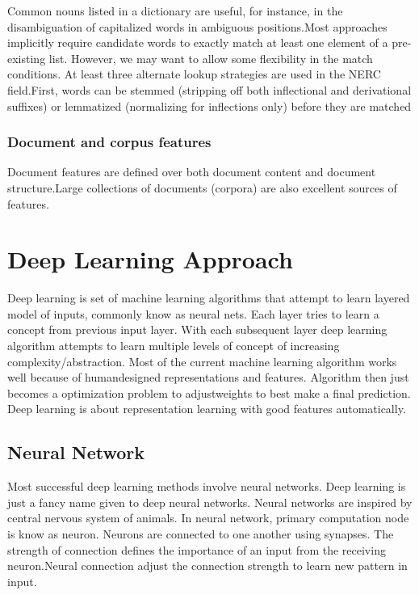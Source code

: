 \documentclass[12pt,a4paper,final]{extreport}
\begin{document}
\vspace{0.5cm}
Common nouns listed in a dictionary are useful, for instance, in the disambiguation of capitalized words in ambiguous positions.Most approaches implicitly require candidate words to exactly match at least one element
of a pre-existing list. However, we may want to allow some flexibility in the match conditions. At least three alternate lookup strategies are used in the NERC field.First, words can be stemmed (stripping off both inflectional and derivational suffixes) or lemmatized (normalizing for inflections only) before they are matched

\subsubsection{Document and corpus features}
Document features are defined over both document content and document structure.Large collections of documents (corpora) are also excellent sources of features.


\section{Deep Learning Approach}
Deep learning is set of machine learning algorithms that attempt to learn layered model of inputs, commonly know as neural nets. Each layer tries to learn a concept from previous input layer. With each subsequent layer deep learning algorithm attempts to learn multiple levels of concept of increasing complexity/abstraction. Most of the current machine learning algorithm works well because of humandesigned representations and features. Algorithm then just becomes a optimization problem to adjustweights to best make a final prediction. Deep learning is about representation learning with good features
automatically.

\subsection{Neural Network}
Most successful deep learning methods involve neural networks. Deep learning is just a fancy name given to deep neural networks. Neural networks are inspired by central nervous system of animals. In neural network, primary computation node is know as neuron. Neurons are connected to one another using synapses. The strength of connection defines the importance of an input from the receiving neuron.Neural connection adjust the connection strength to learn new pattern in input.
\end{document}
